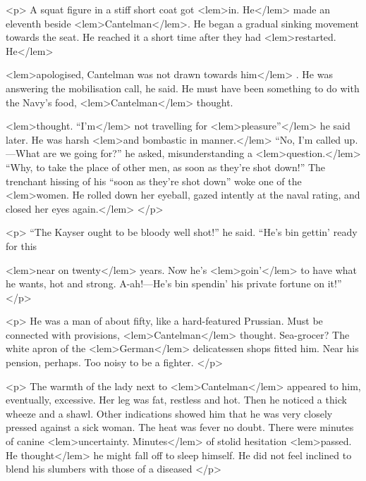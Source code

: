 {{				<p>
					A squat figure in a stiff short coat got 
<lem>in. He</lem>
						{} 
					made an eleventh beside 
<lem>Cantelman</lem>{}. 
					He began a gradual sinking movement towards the seat. He reached it a short time 
					after they had 
<lem>restarted. He</lem>
						{} 
					
<lem>apologised, Cantelman was not drawn towards him</lem>
						{}. 
					He was answering the mobilisation call, 
					he said. He must have been something to do with the Navy's food, 
<lem>Cantelman</lem>{} thought. 
					
<lem>thought. “I'm</lem>
						{} 
					not travelling for 
<lem>pleasure”</lem>
						{} 
					he said later. He was harsh 
<lem>and bombastic in manner.</lem>
						{} 
					“No, I'm 
					called up.---What are we going for?” he asked, misunderstanding a 
<lem>question.</lem>
						{} 
					“Why, to 
					take the place of other men, as soon as they're shot down!” The trenchant hissing of 
					his “soon as they're shot down” woke one of the 
<lem>women. He rolled down her eyeball, gazed intently at the naval rating, and closed her eyes again.</lem>
						{} 
 				</p>

				<p>
					“The Kayser ought to be bloody well shot!” he said. “He's bin gettin' ready for this 
					
<lem>near on twenty</lem>
						{} 
					years. Now he's 
<lem>goin'</lem>
						{} 
					to have what he wants, hot and strong. A-ah!---He's bin 
					spendin' his private fortune on it!” 
 				</p>

				<p>
					He was a man of about fifty, like a hard-featured Prussian. Must be connected with 
					provisions, 
<lem>Cantelman</lem>{} thought. Sea-grocer? The white apron of the 
<lem>German</lem>
						{} 
					delicatessen 
					shops fitted him. Near his pension, perhaps. Too noisy to be a fighter. 
 				</p>

				<p>
					The warmth of the lady next to 
<lem>Cantelman</lem>
						{} 
					appeared to him, eventually, excessive. 
					Her leg was fat, restless and hot. Then he noticed a thick wheeze and a shawl. Other 
					indications showed him that he was very closely pressed against a sick woman. The heat 
					was fever no doubt. There were minutes of canine 
<lem>uncertainty. Minutes</lem>
						{} 
					of stolid hesitation 
<lem>passed. He thought</lem>
						{} 
					he might fall off to sleep himself. He did not feel inclined to blend his 
					slumbers with those of a diseased 
						{} 
 				</p>

}}
